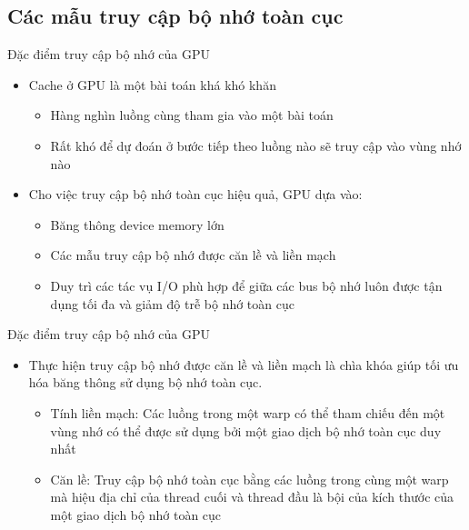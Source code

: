 \documentclass[10pt]{beamer}
\theoremstyle{remark}
\numberwithin{algocf}{section}
\numberwithin{equation}{section}
\numberwithin{dl}{section}
\numberwithin{figure}{section}
\begin{document}
\subsection{Các mẫu truy cập bộ nhớ toàn cục}

\begin{frame}{Đặc điểm truy cập bộ nhớ của GPU}
    \begin{itemize}
        \item Cache ở GPU là một bài toán khá khó khăn
        \begin{itemize}
            \item Hàng nghìn luồng cùng tham gia vào một bài toán
            \item Rất khó để dự đoán ở bước tiếp theo luồng nào sẽ truy cập vào vùng nhớ nào 
        \end{itemize}
    \end{itemize}
    
    \begin{itemize}
        \item Cho việc truy cập bộ nhớ toàn cục hiệu quả, GPU dựa vào:
        \begin{itemize}
            \item Băng thông device memory lớn
            \item Các mẫu truy cập bộ nhớ được căn lề và liền mạch
            \item Duy trì các tác vụ I/O phù hợp để giữa các bus bộ nhớ luôn được tận dụng tối đa và giảm độ trễ bộ nhớ toàn cục
        \end{itemize}
    \end{itemize}
\end{frame}

\begin{frame}{Đặc điểm truy cập bộ nhớ của GPU}
    \begin{itemize}
        \item Thực hiện truy cập bộ nhớ được căn lề và liền mạch là chìa khóa giúp tối ưu hóa băng thông sử dụng bộ nhớ toàn cục.
        \begin{itemize}
            \item Tính liền mạch: Các luồng trong một warp có thể tham chiếu đến một vùng nhớ có thể được sử dụng bởi một giao dịch bộ nhớ toàn cục duy nhất
            \item Căn lề: Truy cập bộ nhớ toàn cục bằng các luồng trong cùng một warp mà hiệu địa chỉ của thread cuối và thread đầu là bội của kích thước của một giao dịch bộ nhớ toàn cục
        \end{itemize}
    \end{itemize}
\end{frame}
\end{document}
